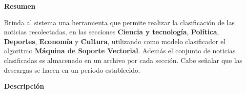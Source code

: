 
\begin{large}
	\textbf{Resumen}\\
\end{large}

Brinda al sistema una herramienta que permite realizar la clasificación de las noticias recolectadas, en las secciones \textbf{Ciencia y tecnología}, \textbf{Política}, \textbf{Deportes}, \textbf{Economía} y  \textbf{Cultura}, utilizando como modelo clasificador el algoritmo \textbf{Máquina de Soporte Vectorial}. Además el conjunto de noticias clasificadas es almacenado en un archivo por cada sección. Cabe señalar que las descargas se hacen en un periodo establecido.\\


\begin{large}
	\textbf{Descripción}\\
\end{large} 


